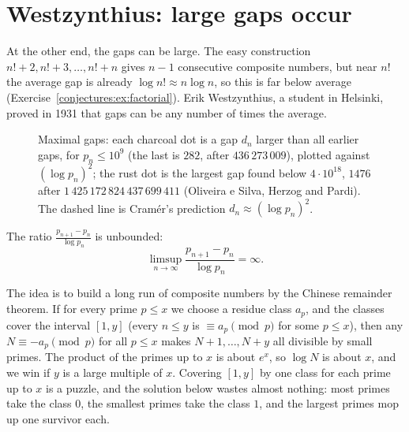 \section{Westzynthius: large gaps occur}

At the other end, the gaps can be large. The easy construction $n!+2,n!+3,\dots,n!+n$ gives $n-1$ consecutive composite numbers, but near
$n!$ the average gap is already $\log n!\approx n\log n$, so this is far below average (Exercise~\ref{conjectures:ex:factorial}). Erik Westzynthius, a student in
Helsinki, proved in 1931 that gaps can be any number of times the average.

\begin{figure}[ht]
\centering
{}
\caption{Maximal gaps: each charcoal dot is a gap $d_n$ larger than all earlier gaps, for $p_n\le10^9$ (the last is $282$, after $436\,273\,009$), plotted
against $(\log p_n)^2$; the rust dot is the largest gap found below $4\cdot10^{18}$, $1476$ after $1\,425\,172\,824\,437\,699\,411$ (Oliveira e Silva, Herzog
and Pardi). The dashed line is Cram\'er's prediction $d_n\approx(\log p_n)^2$.}
\label{conjectures:fig:gaps}
\end{figure}

\begin{theorem}[Westzynthius, 1931]\label{conjectures:thm:westzynthius}
The ratio $\frac{p_{n+1}-p_n}{\log p_n}$ is unbounded:
\[
\limsup_{n\to\infty}\frac{p_{n+1}-p_n}{\log p_n}=\infty.
\]
\end{theorem}

The idea is to build a long run of composite numbers by the Chinese remainder theorem. If for every prime $p\le x$ we choose a residue class $a_p$,
and the classes cover the interval $[1,y]$ (every $n\le y$ is $\equiv a_p\pmod p$ for some $p\le x$), then any $N\equiv-a_p\pmod p$ for all $p\le x$ makes
$N+1,\dots,N+y$ all divisible by small primes. The product of the primes up to $x$ is about $e^x$, so $\log N$ is about $x$, and we win if $y$ is a large
multiple of $x$. Covering $[1,y]$ by one class for each prime up to $x$ is a puzzle, and the solution below wastes almost nothing: most primes
take the class $0$, the smallest primes take the class $1$, and the largest primes mop up one survivor each.


